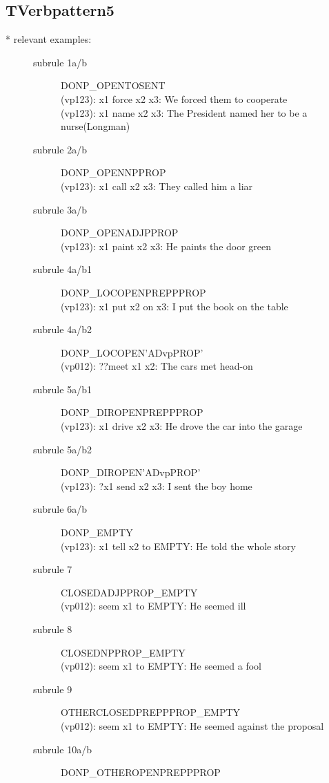 \subsection{TVerbpattern5}
\begin{description}
\item[* relevant examples:] \mbox{}
\begin{description}
\item[subrule 1a/b] DONP\_OPENTOSENT\\
  (vp123): x1 force x2 x3: We forced them to cooperate\\
  (vp123): x1 name x2 x3: The President named her to be a nurse(Longman)
\item[subrule 2a/b] DONP\_OPENNPPROP\\
  (vp123): x1 call x2 x3: They called him a liar 
\item[subrule 3a/b] DONP\_OPENADJPPROP\\
  (vp123): x1 paint x2 x3: He paints the door green\\
\item[subrule 4a/b1] DONP\_LOCOPENPREPPPROP\\
  (vp123): x1 put x2 on x3: I put the book on the table\\
\item[subrule 4a/b2] DONP\_LOCOPEN'ADvpPROP'\\
  (vp012): ??meet x1 x2: The cars met head-on
\item[subrule 5a/b1] DONP\_DIROPENPREPPPROP\\
  (vp123): x1 drive x2 x3: He drove the car into the garage
\item[subrule 5a/b2] DONP\_DIROPEN'ADvpPROP'\\
  (vp123): ?x1 send x2 x3: I sent the boy home
\item[subrule 6a/b] DONP\_EMPTY\\
  (vp123): x1 tell x2 to EMPTY: He told the whole story\\
\item[subrule 7] CLOSEDADJPPROP\_EMPTY\\
  (vp012): seem x1 to EMPTY: He seemed ill\\
\item[subrule 8] CLOSEDNPPROP\_EMPTY\\
  (vp012): seem x1 to EMPTY: He seemed a fool 
\item[subrule 9] OTHERCLOSEDPREPPPROP\_EMPTY\\
  (vp012): seem x1 to EMPTY: He seemed against the proposal 
\item[subrule 10a/b] DONP\_OTHEROPENPREPPPROP\\

\end{description}
\end{description}
